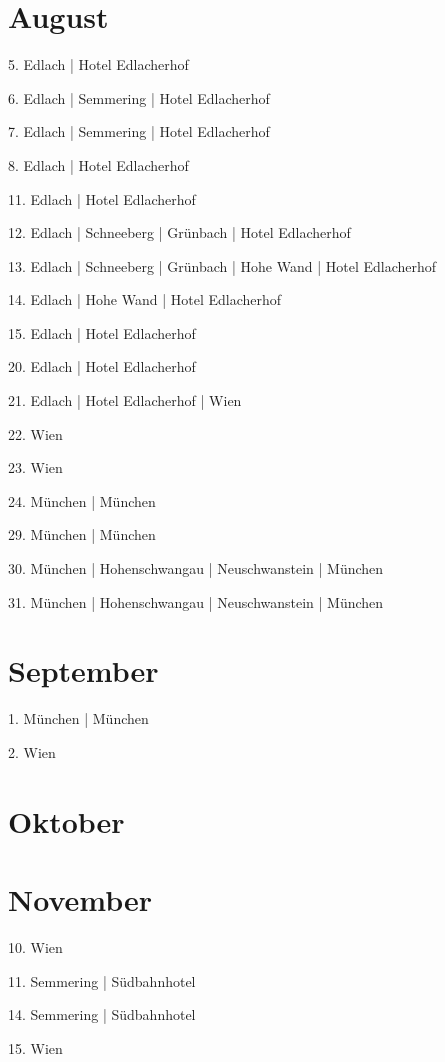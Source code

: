 \documentclass[twoside=false,titlepage=false,open=any, parskip=never, fontsize=10pt, headings=small, chapterprefix=false, appendixprefix=false, DIV=15]{scrbook}
\begin{document}
\begin{multicols}{3}
            \section*{August}
            5. Edlach | Hotel Edlacherhof\par
            6. Edlach | Semmering | Hotel Edlacherhof\par
            7. Edlach | Semmering | Hotel Edlacherhof\par
            8. Edlach | Hotel Edlacherhof\par
            11. Edlach | Hotel Edlacherhof\par
            12. Edlach | Schneeberg | Grünbach | Hotel Edlacherhof\par
            13. Edlach | Schneeberg | Grünbach | Hohe Wand | Hotel Edlacherhof\par
            14. Edlach | Hohe Wand | Hotel Edlacherhof\par
            15. Edlach | Hotel Edlacherhof\par
            20. Edlach | Hotel Edlacherhof\par
            21. Edlach | Hotel Edlacherhof | Wien\par
            22. Wien\par
            23. Wien\par
            24. München | München\par
            29. München | München\par
            30. München | Hohenschwangau | Neuschwanstein | München\par
            31. München | Hohenschwangau | Neuschwanstein | München\par
            \section*{September}
            1. München | München\par
            2. Wien\par
            \section*{Oktober}
            \section*{November}
            10. Wien\par
            11. Semmering | Südbahnhotel\par
            14. Semmering | Südbahnhotel\par
            15. Wien\par

\end{multicols}
\end{document}
